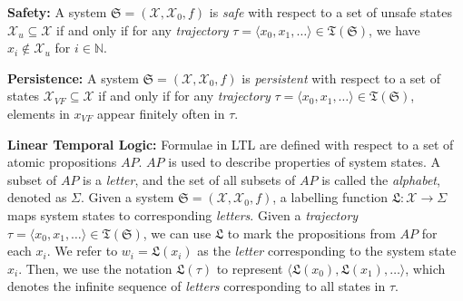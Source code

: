 \documentclass[acmlarge]{acmart}
\begin{document}
\textbf{Safety:} A system $\mathfrak{S}=(\mathcal{X}, \mathcal{X}_0, f)$ is \emph{safe} with respect to a set of unsafe states $\mathcal{X}_u \subseteq \mathcal{X}$ if and only if for any \emph{trajectory} $\tau = \langle x_0, x_1, \dots \rangle \in \mathfrak{T}(\mathfrak{S})$, we have $x_i \not\in \mathcal{X}_u$ for $i \in \mathbb{N}$.

\textbf{Persistence:} A system $\mathfrak{S}=(\mathcal{X}, \mathcal{X}_0, f)$ is \emph{persistent} with respect to a set of states $\mathcal{X}_{VF} \subseteq \mathcal{X}$ if and only if for any \emph{trajectory} $\tau = \langle x_0, x_1, \dots \rangle \in \mathfrak{T}(\mathfrak{S})$, elements in $x_{VF}$ appear finitely often in $\tau$.




\textbf{Linear Temporal Logic:} Formulae in LTL \cite{pnueli1977temporal} are defined with respect to a set of atomic propositions $AP$. $AP$ is used to describe properties of system states. A subset of $AP$ is a \emph{letter}, and the set of all subsets of $AP$ is called the \emph{alphabet}, denoted as $\Sigma$. Given a system $\mathfrak{S}=(\mathcal{X}, \mathcal{X}_0, f)$, a labelling function $\mathfrak{L}: \mathcal{X} \rightarrow \Sigma$ maps system states to corresponding \emph{letters}. Given a \emph{trajectory} $\tau = \langle x_0, x_1, \dots \rangle \in \mathfrak{T}(\mathfrak{S})$, we can use $\mathfrak{L}$ to mark the propositions from $AP$ for each $x_i$. We refer to $w_i = \mathfrak{L}(x_i)$ as the \emph{letter} corresponding to the system state $x_i$. Then, we use the notation $\mathfrak{L}(\tau)$ to represent $\langle \mathfrak{L}(x_0), \mathfrak{L}(x_1), \dots \rangle$, which denotes the infinite sequence of \emph{letters} corresponding to all states in $\tau$.
\end{document}
